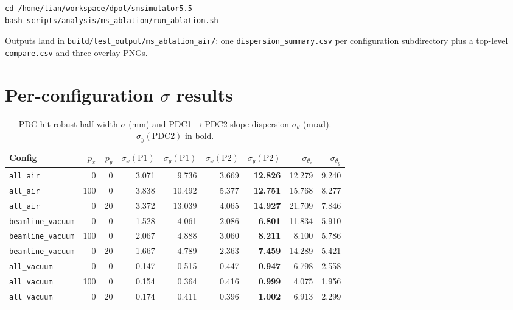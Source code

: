 \documentclass[a4paper, 11pt]{article}
\begin{document}
\begin{verbatim}
cd /home/tian/workspace/dpol/smsimulator5.5
bash scripts/analysis/ms_ablation/run_ablation.sh
\end{verbatim}

Outputs land in \verb|build/test_output/ms_ablation_air/|: one \texttt{dispersion\_summary.csv} per configuration subdirectory plus a top-level \texttt{compare.csv} and three overlay PNGs.

\section{Per-configuration $\sigma$ results}

\begin{table}[H]
\centering
\caption{PDC hit robust half-width $\sigma$ (mm) and PDC1$\to$PDC2 slope dispersion $\sigma_\theta$ (mrad). $\sigma_y(\mathrm{PDC2})$ in bold.}
\label{tab:sigma_raw}
\small
\begin{tabular}{lrrrrrrrr}
\toprule
Config & $p_x$ & $p_y$ & $\sigma_x(\mathrm{P1})$ & $\sigma_y(\mathrm{P1})$ & $\sigma_x(\mathrm{P2})$ & $\sigma_y(\mathrm{P2})$ & $\sigma_{\theta_x}$ & $\sigma_{\theta_y}$\\
\midrule
\texttt{all\_air}         & 0    & 0  & 3.071 &  9.736 & 3.669 & \textbf{12.826} & 12.279 & 9.240 \\
\texttt{all\_air}         & 100  & 0  & 3.838 & 10.492 & 5.377 & \textbf{12.751} & 15.768 & 8.277 \\
\texttt{all\_air}         & 0    & 20 & 3.372 & 13.039 & 4.065 & \textbf{14.927} & 21.709 & 7.846 \\
\addlinespace
\texttt{beamline\_vacuum} & 0    & 0  & 1.528 &  4.061 & 2.086 & \textbf{ 6.801} & 11.834 & 5.910 \\
\texttt{beamline\_vacuum} & 100  & 0  & 2.067 &  4.888 & 3.060 & \textbf{ 8.211} &  8.100 & 5.786 \\
\texttt{beamline\_vacuum} & 0    & 20 & 1.667 &  4.789 & 2.363 & \textbf{ 7.459} & 14.289 & 5.421 \\
\addlinespace
\texttt{all\_vacuum}      & 0    & 0  & 0.147 &  0.515 & 0.447 & \textbf{ 0.947} &  6.798 & 2.558 \\
\texttt{all\_vacuum}      & 100  & 0  & 0.154 &  0.364 & 0.416 & \textbf{ 0.999} &  4.075 & 1.956 \\
\texttt{all\_vacuum}      & 0    & 20 & 0.174 &  0.411 & 0.396 & \textbf{ 1.002} &  6.913 & 2.299 \\
\bottomrule
\end{tabular}
\end{table}
\end{document}
